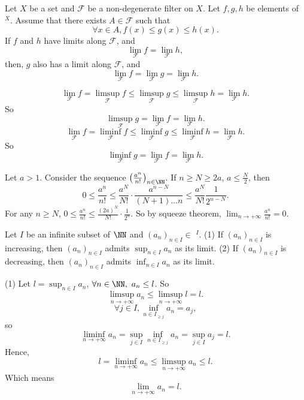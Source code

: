 \begin{theoremenv}
    Let $X$ be a set and $\mathcal{F}$ be a non-degenerate filter on $X$. Let $f,g,h$ be elements of $^X$. Assume that there exists $A\in \mathcal{F}$ such that 
    $$\forall x\in A, f(x)\le g(x)\le h(x).$$
    If $f$ and $h$ have limits along $\mathcal{F}$, and 
    $$\lim_{\mathcal{F}}f=\lim_{\mathcal{F}}h,$$
    then, $g$ also has a limit along $\mathcal{F}$, and 
    $$\lim_{\mathcal{F}}f=\lim_{\mathcal{F}}g=\lim_{\mathcal{F}}h.$$
\end{theoremenv}
\begin{proofenv}
    $$\lim_{\mathcal{F}}f=\limsup_{\mathcal{F}}f\le \limsup_{\mathcal{F}}g\le \limsup_{\mathcal{F}}h=\lim_{\mathcal{F}}h.$$
    So 
    $$\limsup_{\mathcal{F}} g=\lim_{\mathcal{F}}f=\lim_{\mathcal{F}}h.$$
    $$\lim_{\mathcal{F}}f=\liminf_{\mathcal{F}}f\le \liminf_{\mathcal{F}}g\le \liminf_{\mathcal{F}}h=\lim_{\mathcal{F}}h.$$
    So 
    $$\liminf_{\mathcal{F}} g=\lim_{\mathcal{F}}f=\lim_{\mathcal{F}}h.$$
\end{proofenv}
\begin{exampleenv}
    Let $a>1$. Consider the sequence $\left(\frac{a^n}{n!}\right)_{n\in \NN}$. If $n\ge N\ge 2a $, $a\le \frac{N}{2}$, then 
    $$0\le \frac{a^n}{n!}\le \frac{a^N}{N!}\cdot\frac{a^{n-N}}{(N+1)\dots n}\le \frac{a^N}{N!}\frac{1}{2^{n-N}}.$$
    For any $n\ge N$, $0\le \frac{a^n}{n!}\le \frac{(2a)^N}{N!}\cdot \frac{1}{2^n}.$ So by squeeze theorem, $\displaystyle\lim_{n\rightarrow+\infty}\frac{a^n}{n!}=0$.
\end{exampleenv}
\begin{theoremenv}
    Let $I$ be an infinite subset of $\NN$ and $(a_n)_{n\in I}\in$ $^I$.
    \newline
    (1) If $(a_n)_{n\in I}$ is increasing, then $(a_n)_{n\in I}$ admits $\displaystyle \sup_{n\in I}a_n$ as its limit.
    \newline
    (2) If $(a_n)_{n\in I}$ is decreasing, then $(a_n)_{n\in I}$ admits $\displaystyle \inf_{n\in I}a_n$ as its limit.
    
\end{theoremenv}
\begin{proofenv}
    \quad\newline
    (1) Let $l=\sup_{n\in I} a_n$, $\forall n\in \NN,\ a_n\le l$. So 
    $$\limsup_{n\rightarrow +\infty}a_n\le\limsup_{n\rightarrow +\infty}l=l.$$
    $$\forall j\in I, \inf_{n\in I_{\ge j}}a_n=a_j,$$
    so $$\liminf_{n\rightarrow+\infty}a_n=\sup_{j\in I}\inf_{n\in I_{\ge j}}a_n=\sup_{j\in I}a_j=l.$$
    Hence,
    $$l=\liminf_{n\rightarrow+\infty}a_n\le \limsup_{n\rightarrow+\infty}a_n\le l .$$
    Which means 
    $$\lim_{n\rightarrow +\infty}a_n=l.$$
\end{proofenv}
